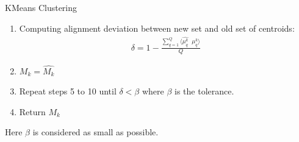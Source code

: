 \documentclass{beamer}
\newcounter{saveenumi}
\newcommand{\conti}{\setcounter{enumi}{\value{saveenumi}}}
\begin{document}
\begin{frame}{KMeans Clustering}
    \begin{enumerate}
    \conti
        \item Computing alignment deviation between new set and old set of centroids:
        \begin{align*}
            \delta = 1 - \frac{\sum_{q=1}^{Q}\langle \hat{\mu_{q}^{k}}\; \; \mu_{q}^{k} \rangle}{Q}
        \end{align*}
        \item $M_{k} = \hat{M_{k}}$
        \item Repeat steps 5 to 10 until $\delta < \beta $ where $\beta$ is the tolerance.
        \item Return $M_{k}$
    \end{enumerate}
     Here $\beta$ is considered as small as possible.
\end{frame}
\end{document}
